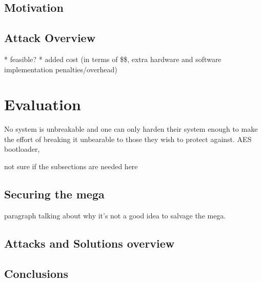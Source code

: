 \documentclass[10pt,a4paper,twocolumn]{article}
\begin{document}
	\subsection{Motivation}
	
	\subsection{Attack Overview}
		* feasible? 
		* added cost (in terms of \$\$, extra hardware and software implementation penalties/overhead)
	

\section{Evaluation}
\label{sec:conclusion}

No system is unbreakable and one can only harden their system enough to make the effort of breaking it unbearable to those they wish to protect against\citep{anderson:cautionary_note}\cite{website:scorobogatov_breaking_copy_protection}. AES bootloader\citep{tech:aes_bls},

	not sure if the subsections are needed here
	\subsection{Securing the mega}
		paragraph talking about why it's not a good idea to salvage the mega.
	\subsection{Attacks and Solutions overview}
	\subsection{Conclusions}
	
	
		
	
\end{document}
